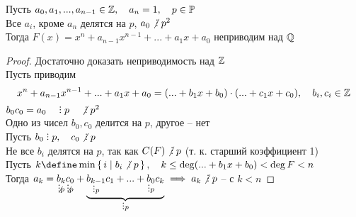 \begin{theorem}
    Пусть $a_0, a_1, ..., a_{n - 1} \in \mathbb{Z}, \quad a_n = 1, \quad p \in \mathbb{P}$ \\
    Все $a_i$, кроме $a_n$ делятся на $p$, \quad $a_0 \ndivby p^2$ \\
    Тогда $F(x) = x^n + a_{n - 1}x^{n - 1} + ... + a_1x + a_0$ неприводим над $\mathbb{Q}$
\end{theorem}

\begin{proof}
	Достаточно доказать неприводимость над $\mathbb{Z}$ \\
    Пусть приводим
    $$ x^n + a_{n - 1}x^{n - 1} + ... + a_1x + a_0 = (... + b_1x + b_0) \cdot (... + c_1x + c_0), \quad b_i, c_i \in \mathbb{Z} $$
    $b_0c_0 = a_0 \quad \divby p \quad \ndivby p^2 $ \\
    Одно из чисел $b_0, c_0$ делится на $p$, другое -- нет \\
    Пусть $b_0 \divby p, \quad c_0 \ndivby p$ \\
    Не все $b_i$ делятся на $p$, так как $C(F) \ndivby p$ (т. к. старший коэффициент 1) \\
    Пусть $k \define \min\set{i | b_i \ndivby p}, \quad k \le \deg (... + b_1x + b_0) < \deg F < n $ \\
    Тогда $a_k = \underset{\ndivby p}{b_k}\underset{\ndivby p}{c_0} + \underbrace{\underset{\divby p}{b_{k - 1}}c_1 + ... + \underset{\divby p}{b_0}c_k}_{\divby p} \implies a_k \ndivby p $ -- \contra с $k < n$
\end{proof}
